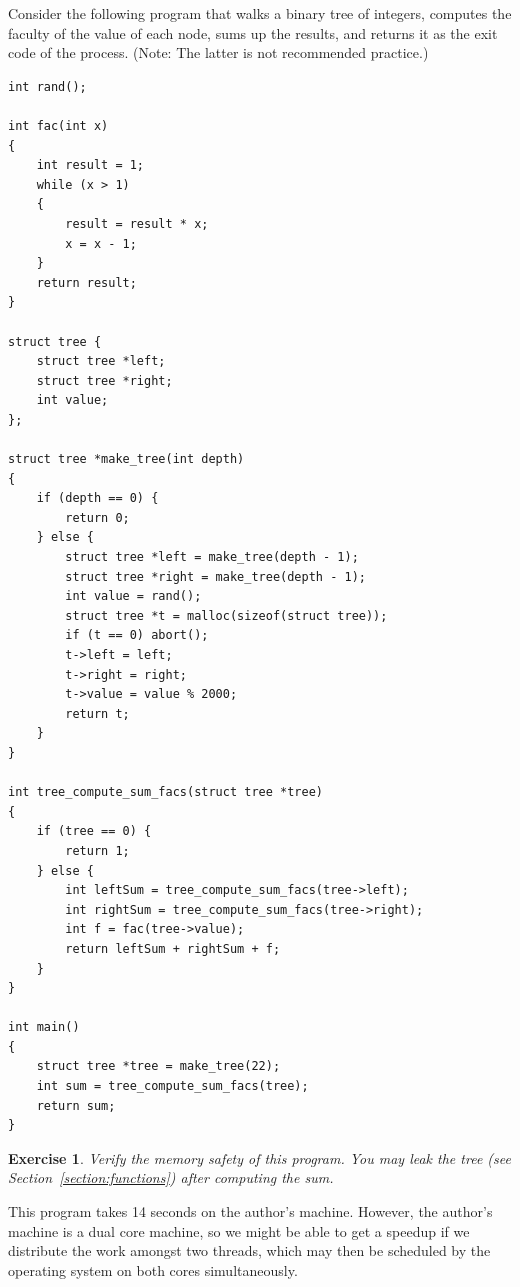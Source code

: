 \documentclass{article}
\newtheorem{exercise}{Exercise}
\begin{document}
Consider the following program that walks a binary tree of
integers, computes the faculty of the value of each node, sums
up the results, and returns it as the exit code of the process.
(Note: The latter is not recommended practice.)
\begin{lstlisting}
int rand();

int fac(int x)
{
    int result = 1;
    while (x > 1)
    {
        result = result * x;
        x = x - 1;
    }
    return result;
}

struct tree {
    struct tree *left;
    struct tree *right;
    int value;
};

struct tree *make_tree(int depth)
{
    if (depth == 0) {
        return 0;
    } else {
        struct tree *left = make_tree(depth - 1);
        struct tree *right = make_tree(depth - 1);
        int value = rand();
        struct tree *t = malloc(sizeof(struct tree));
        if (t == 0) abort();
        t->left = left;
        t->right = right;
        t->value = value % 2000;
        return t;
    }
}

int tree_compute_sum_facs(struct tree *tree)
{
    if (tree == 0) {
        return 1;
    } else {
        int leftSum = tree_compute_sum_facs(tree->left);
        int rightSum = tree_compute_sum_facs(tree->right);
        int f = fac(tree->value);
        return leftSum + rightSum + f;
    }
}

int main()
{
    struct tree *tree = make_tree(22);
    int sum = tree_compute_sum_facs(tree);
    return sum;
}
\end{lstlisting}

\begin{exercise}\label{exercise:threads0}
Verify the memory safety of this program. You may leak the tree (see Section~\ref{section:functions}) after computing the sum.
\end{exercise}

This program takes 14 seconds on the author's machine. However,
the author's machine is a dual core machine, so we might be
able to get a speedup if we distribute the work amongst two
threads, which may then be scheduled by the operating system on
both cores simultaneously.
\end{document}
